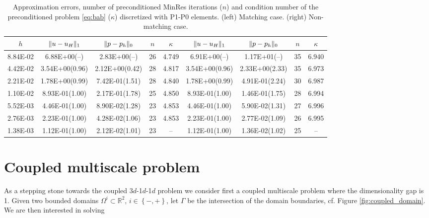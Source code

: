 \documentclass[r]{siamart171218}
\begin{document}
\begin{table}
  \begin{center}
    \footnotesize{
  \begin{tabular}{c|cc|c|c||cc|c|c}
    \hline
    $h$ & $\lVert{u-u_H}\rVert_1$ & $\lVert{p-p_h}\rVert_0$ & $n$ & $\kappa$
        & $\lVert{u-u_H}\rVert_1$ & $\lVert{p-p_h}\rVert_0$ & $n$ & $\kappa$ \\
    \hline
8.84E-02 & 6.88E+00(--)   & 2.83E+00(--)  & 26 & 4.749  & 6.91E+00(--)   & 1.17E+01(--)  & 35 & 6.940 \\
4.42E-02 & 3.54E+00(0.96) & 2.12E+00(0.42)& 28 & 4.817  & 3.54E+00(0.96) & 2.33E+00(2.33)& 35 & 6.973 \\
2.21E-02 & 1.78E+00(0.99) & 7.42E-01(1.51)& 28 & 4.840  & 1.78E+00(0.99) & 4.91E-01(2.24)& 30 & 6.987 \\
1.10E-02 & 8.93E-01(1.00) & 2.17E-01(1.78)& 25 & 4.850  & 8.93E-01(1.00) & 1.46E-01(1.75)& 28 & 6.994 \\
5.52E-03 & 4.46E-01(1.00) & 8.90E-02(1.28)& 23 & 4.853  & 4.46E-01(1.00) & 5.90E-02(1.31)& 27 & 6.996 \\
2.76E-03 & 2.23E-01(1.00) & 4.28E-02(1.06)& 23 & 4.853  & 2.23E-01(1.00) & 2.77E-02(1.09)& 26 & 6.995 \\
1.38E-03 & 1.12E-01(1.00) & 2.12E-02(1.01)& 23 & --     & 1.12E-01(1.00) & 1.36E-02(1.02)& 25 & --    \\  
    \hline
  \end{tabular}
    }
    \caption{Approximation errors, number of preconditioned MinRes iterations ($n$) and
      condition number of the preconditioned problem \eqref{eq:bab} ($\kappa$) discretized
      with P1-P0 elements. (left) Matching case. (right) Non-matching case.}
  \label{tab:p1_p0}
  \end{center}
\end{table}

\section{Coupled multiscale problem}\label{sec:coupled} As a stepping stone
towards the coupled 3$d$-1$d$-1$d$ problem we consider first a coupled multiscale
problem where the dimensionality gap is 1. Given two bounded domains $\Omega^i \subset\mathbb{R}^2$,
$i\in\left\{-, +\right\}$, let $\Gamma$ be the intersection of the domain boundaries,
cf. Figure \ref{fig:coupled_domain}. We are then interested in solving
\end{document}

